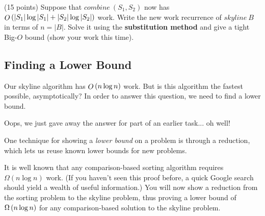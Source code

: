 \begin{task}[9]
(15 points)
Suppose that $\mathit{combine}~(S_1, S_2)$ now has
$\mathop{O}\left(|S_1|\log|S_1| + |S_2|\log|S_2|\right)$ work. Write the new work recurrence of
$\mathit{skyline}~B$ in terms of $n = |B|$. Solve it using the
\textbf{substitution method} and give a tight Big-$O$ bound (show your work this time).
\end{task}

\subsection{Finding a Lower Bound}
\begin{flex}
\begin{gram}
Our skyline algorithm has $\mathop{O}\left(n \log n\right)$ work. But is this
algorithm the fastest possible, asymptotically? In order to answer this
question, we need to find a lower bound.
\end{gram}
\begin{remark}
Oops, we just gave away the answer for part of an earlier task... oh well!
\end{remark}
\end{flex}

\begin{gram}
One technique for showing a \emph{lower bound} on a problem is through a
reduction, which lets us reuse known lower bounds for new problems.
\end{gram}

\begin{gram}
It is well known that any comparison-based sorting algorithm requires
$\Omega(n \log n)$ work. (If you haven't seen this
proof before, a quick Google search should yield a wealth of useful
information.) You will now show a reduction from the sorting problem
to the skyline problem, thus proving a lower bound of $\Omega\left(n \log n\right)$
for any comparison-based solution to the skyline problem.
\end{gram}

